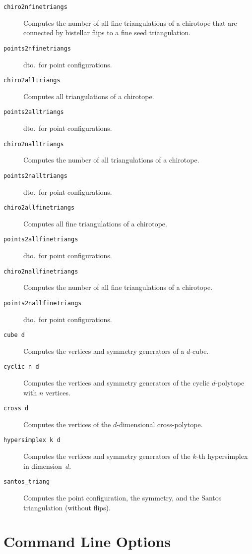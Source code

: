 \documentclass[12pt,a4paper]{article}
\begin{document}
\begin{description}
\item[\texttt{chiro2nfinetriangs}] Computes the number of all fine
  triangulations of a chirotope that are connected by bistellar flips to a fine
  seed triangulation.
\item[\texttt{points2nfinetriangs}] dto.\ for point configurations.

\item[\texttt{chiro2alltriangs}] Computes all triangulations of a chirotope.
\item[\texttt{points2alltriangs}] dto.\ for point configurations.

\item[\texttt{chiro2nalltriangs}] Computes the number of all triangulations of a
  chirotope.
\item[\texttt{points2nalltriangs}] dto.\ for point configurations.

\item[\texttt{chiro2allfinetriangs}] Computes all fine triangulations of a
  chirotope.
\item[\texttt{points2allfinetriangs}] dto.\ for point configurations.
  
\item[\texttt{chiro2nallfinetriangs}] Computes the number of all fine
  triangulations of a chirotope.
\item[\texttt{points2nallfinetriangs}] dto.\ for point configurations.

\item[\texttt{cube d}] Computes the vertices and symmetry generators of a
  $d$-cube.
\item[\texttt{cyclic n d}] Computes the vertices and symmetry generators of
  the cyclic $d$-polytope with $n$ vertices.
\item[\texttt{cross d}] Computes the vertices of the $d$-dimensional cross-polytope.
\item[\texttt{hypersimplex k d}] Computes the vertices and symmetry generators of 
  the $k$-th hypersimplex in dimension~$d$.
\item[\texttt{santos\_triang}] Computes the point configuration, the symmetry,
  and the Santos triangulation (without flips).
\end{description}



\section{Command Line Options}
\label{sec:options}
\end{document}
